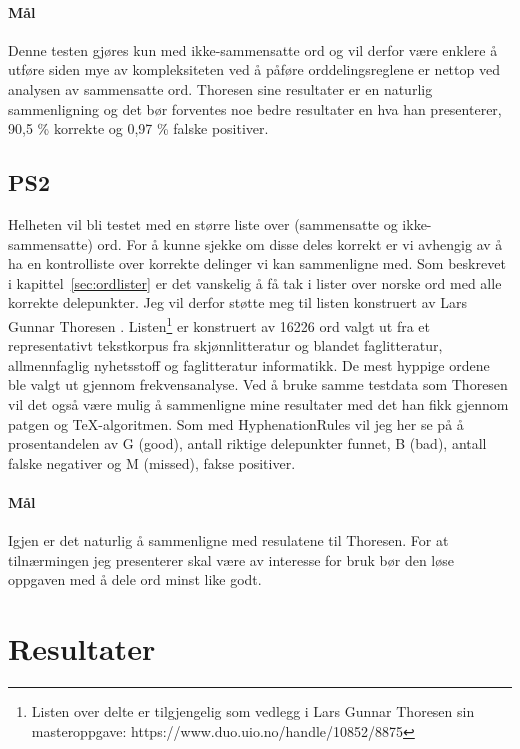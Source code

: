 \paragraph{Mål} Denne testen gjøres kun med ikke-sammensatte ord og vil derfor være enklere å utføre siden mye av kompleksiteten ved å påføre orddelingsreglene er nettop ved analysen av sammensatte ord. Thoresen \cite{thoresen1993virtuelle} sine resultater er en naturlig sammenligning og det bør forventes noe bedre resultater en hva han presenterer, 90,5 \% korrekte og 0,97 \% falske positiver.

\subsection{PS2}

Helheten vil bli testet med en større liste over (sammensatte og ikke-sammensatte) ord. For å kunne sjekke om disse deles korrekt er vi avhengig av å ha en kontrolliste over korrekte delinger vi kan sammenligne med. Som beskrevet i kapittel~\ref{sec:ordlister} er det vanskelig å få tak i lister over norske ord med alle korrekte delepunkter. Jeg vil derfor støtte meg til listen konstruert av Lars Gunnar Thoresen \cite{thoresen1993virtuelle}. Listen\footnote{Listen over delte er tilgjengelig som vedlegg i Lars Gunnar Thoresen sin masteroppgave: https://www.duo.uio.no/handle/10852/8875} er konstruert av 16226 ord valgt ut fra et representativt tekstkorpus fra skjønnlitteratur og blandet faglitteratur, allmennfaglig nyhetsstoff og faglitteratur informatikk. De mest hyppige ordene ble valgt ut gjennom frekvensanalyse. Ved å bruke samme testdata som Thoresen vil det også være mulig å sammenligne mine resultater med det han fikk gjennom patgen og \TeX{}-algoritmen. Som med HyphenationRules vil jeg her se på å prosentandelen av G (good), antall riktige delepunkter funnet, B (bad), antall falske negativer og M (missed), fakse positiver.

\paragraph{Mål} Igjen er det naturlig å sammenligne med resulatene til Thoresen. For at tilnærmingen jeg presenterer skal være av interesse for bruk bør den løse oppgaven med å dele ord minst like godt. 

\section{Resultater}

